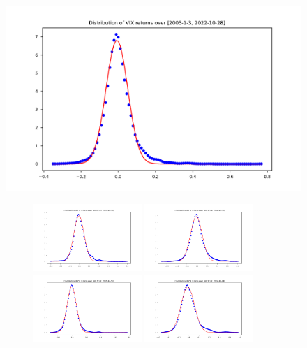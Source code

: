 \begin{figure}[htbp]
    \centering
    \includegraphics[width=\textwidth]{content/reschap4/Figures/VIX_dist_2005-1-3-2022-10-28.pdf}
    \centering
    \begin{subfigure}[b]{\textwidth}
        \centering
        \includegraphics[width=0.45\textwidth]{content/reschap4/Figures/VIX_dist_2005-1-3-2009-12-31.pdf}
        \includegraphics[width=0.45\textwidth]{content/reschap4/Figures/VIX_dist_2010-1-4-2014-12-31.pdf}
        \includegraphics[width=0.45\textwidth]{content/reschap4/Figures/VIX_dist_2015-1-2-2019-12-31.pdf}
        \includegraphics[width=0.45\textwidth]{content/reschap4/Figures/VIX_dist_2020-1-2-2022-10-28.pdf}

\end{subfigure}
\end{figure}
